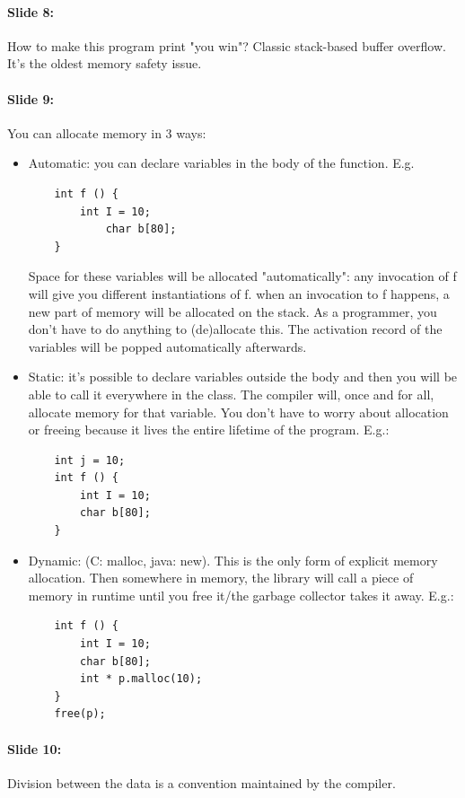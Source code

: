 \documentclass[10pt,a4paper]{report}
\begin{document}
\paragraph{Slide 8:} How to make this program print "you win"? Classic stack-based buffer overflow. It's the oldest memory safety issue.

\paragraph{Slide 9:} You can allocate memory in 3 ways:
\begin{itemize}
\item Automatic: you can declare variables in the body of the function. E.g.
\begin{verbatim}
	int f () {
	    int I = 10;
	        char b[80];
	}
\end{verbatim}
Space for these variables will be allocated "automatically": any invocation of f will give you different instantiations of f. when an invocation to f happens, a new part of memory will be allocated on the stack. As a programmer, you don't have to do anything to (de)allocate this. The activation record of the variables will be popped automatically afterwards.
\item Static: it's possible to declare variables outside the body and then you will be able to call it everywhere in the class. The compiler will, once and for all, allocate memory for that variable. You don't have to worry about allocation or freeing because it lives the entire lifetime of the program. E.g.:
\begin{verbatim}
	int j = 10;
	int f () {
	    int I = 10;
	    char b[80];
	}
\end{verbatim}
\item Dynamic: (C: malloc, java: new). This is the only form of explicit memory allocation. Then somewhere in memory, the library will call a piece of memory in runtime until you free it/the garbage collector takes it away. E.g.:
\begin{verbatim}
	int f () {
	    int I = 10;    
	    char b[80];    
	    int * p.malloc(10);
	} 
	free(p);
\end{verbatim}
\end{itemize}

\paragraph{Slide 10:} Division between the data is a convention maintained by the compiler.
\end{document}
